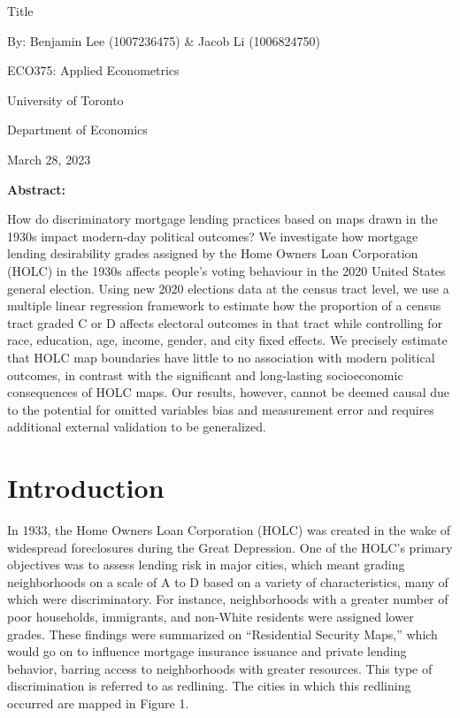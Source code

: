 \documentclass{eco_375_paper}
\begin{document}
\vspace*{\fill}
\begin{center}
	Title 
	
	By: Benjamin Lee (1007236475) \& Jacob Li (1006824750)
	\bigskip
	
	ECO375: Applied Econometrics 
	
	University of Toronto
	
	Department of Economics
	
	March 28, 2023
	
	\bigskip
	\textbf{Abstract: }
	
	How do discriminatory mortgage lending practices based on maps drawn in the 1930s impact modern-day political outcomes? We investigate how mortgage lending desirability grades assigned by the Home Owners Loan Corporation (HOLC) in the 1930s affects people’s voting behaviour in the 2020 United States general election. Using new 2020 elections data at the census tract level, we use a multiple linear regression framework to estimate how the proportion of a census tract graded C or D affects electoral outcomes in that tract while controlling for race, education, age, income, gender, and city fixed effects. We precisely estimate that HOLC map boundaries have little to no association with modern political outcomes, in contrast with the significant and long-lasting socioeconomic consequences of HOLC maps. Our results, however, cannot be deemed causal due to the potential for omitted variables bias and measurement error and requires additional external validation to be generalized.
\end{center}
\vspace*{\fill}
\pagebreak

\section*{Introduction}
In 1933, the Home Owners Loan Corporation (HOLC) was created in the wake of widespread foreclosures during the Great Depression. One of the HOLC’s primary objectives was to assess lending risk in major cities, which meant grading neighborhoods on a scale of A to D based on a variety of characteristics, many of which were discriminatory. For instance, neighborhoods with a greater number of poor households, immigrants, and non-White residents were assigned lower grades. These findings were summarized on “Residential Security Maps,” which would go on to influence mortgage insurance issuance and private lending behavior, barring access to neighborhoods with greater resources. This type of discrimination is referred to as redlining. The cities in which this redlining occurred are mapped in Figure 1.
\end{document}
